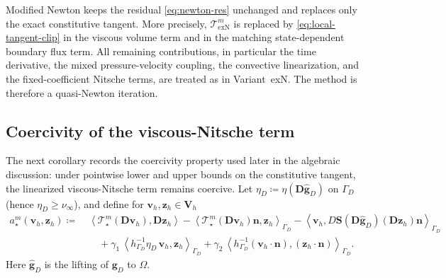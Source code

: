 \documentclass[DIV=16]{scrartcl}
\newcommand{\Ip}[2]{\left\langle #1,#2\right\rangle}
\newcommand{\uu}{\boldsymbol v}
\renewcommand{\vv}{\boldsymbol z}
\newcommand{\nn}{\boldsymbol n}
\newcommand{\DD}{\boldsymbol D} %
\newcommand{\Sstress}{\boldsymbol S} %
\newcommand{\exact}{\mathrm{exN}}
\newcommand{\GhD}{\Gamma_{D}}
\newcommand{\Vh}{\boldsymbol V_h}
\newcommand{\gOne}{\gamma_{1}}  %
\newcommand{\gTwo}{\gamma_{2}}  %
\newcommand{\hGD}{h_{\Gamma_D}} %
\newcommand{\etaeff}[1]{\eta \left(#1\right)}
\newcommand{\DStress}[2]{D\Sstress \left(#1\right) \left(#2\right)}
\begin{document}
Modified Newton keeps the residual \eqref{eq:newton-res} unchanged and replaces
only the exact constitutive tangent.
More precisely, $\mathcal T_{\exact}^m$ is replaced by
\eqref{eq:local-tangent-clip} in the viscous volume term and in the matching
state-dependent boundary flux term.
All remaining contributions, in particular the time derivative, the mixed
pressure-velocity coupling, the convective linearization, and the
fixed-coefficient Nitsche terms, are treated as in Variant~exN.
The method is therefore a quasi-Newton iteration.

\subsection{Coercivity of the viscous-Nitsche term}
The next corollary records the coercivity property used later in the algebraic
discussion: under pointwise lower and upper bounds on the constitutive tangent,
the linearized viscous-Nitsche term remains coercive.
Let $\eta_D\coloneq \etaeff{\DD\hat{\boldsymbol g}_D}$ on $\GhD$ (hence
$\eta_D\ge \nu_\infty$), and define for $\uu_h,\vv_h\in\Vh$
\begin{equation}\label{eq:am-def}
  \begin{aligned}
    a_{\star}^m(\uu_h,\vv_h)
    \coloneqq\;&
                 \Ip{\mathcal T_\star^m(\DD\uu_h)}{\DD\vv_h}
                 -\Ip{\mathcal T_\star^m(\DD\uu_h)\nn}{\vv_h}_{\GhD}
                 -\Ip{\uu_h}{\DStress{\DD\hat{\boldsymbol g}_D}{\DD\vv_h}\nn}_{\GhD} \\
               &\quad
                 +\gOne\,\Ip{\hGD^{-1}\eta_D\,\uu_h}{\vv_h}_{\GhD}
                 +\gTwo\,\Ip{\hGD^{-1}(\uu_h\cdot\nn)}{(\vv_h\cdot\nn)}_{\GhD}.
  \end{aligned}
\end{equation}
Here $\hat{\boldsymbol g}_D$ is the lifting of $\boldsymbol g_D$ to $\Omega$.
\end{document}
